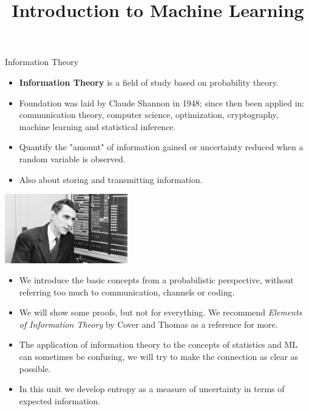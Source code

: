 \documentclass[11pt,compress,t,notes=noshow, xcolor=table]{beamer}
\title{Introduction to Machine Learning}
\begin{document}
    

\begin{vbframe}{Information Theory}

\begin{itemize}
  \item \textbf{Information Theory} is a field of study based on probability theory.
  \item Foundation was laid by Claude Shannon in 1948; since then been applied in: communication theory, computer science, optimization, cryptography, machine learning and statistical inference.

  \item Quantify the "amount" of information gained or 
    uncertainty reduced when a random variable is observed.

  \item Also about storing and transmitting information.
\end{itemize}

  \begin{center}
\includegraphics[width = 0.4\textwidth]{figure_man/claude-shannon.jpg} \\
\end{center}

\framebreak

\lz
\begin{itemize}
\setlength\itemsep{1.2em}
  \item We introduce the basic concepts from a probabilistic perspective, without referring too much to communication, channels or coding.
  \item We will show some proofs, but not for everything. We recommend 
    \textit{Elements of Information Theory} by Cover and Thomas as a reference for more. 
  \item The application of information theory to the concepts of statistics and ML can sometimes be confusing, we will try to make the connection as clear as possible.
  \item In this unit we develop entropy as a measure of uncertainty in terms of expected information.
\end{itemize}
\end{vbframe}
\end{document}
